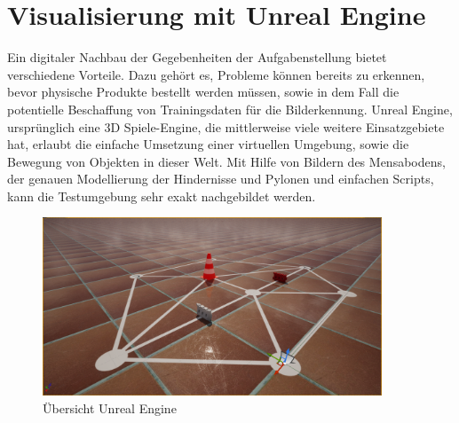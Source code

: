 \newpage
\section{Visualisierung mit Unreal Engine}
Ein digitaler Nachbau der Gegebenheiten der Aufgabenstellung bietet verschiedene Vorteile. Dazu gehört es, Probleme können bereits zu erkennen, bevor physische Produkte bestellt werden müssen, sowie in dem Fall die potentielle Beschaffung von Trainingsdaten für die Bilderkennung. Unreal Engine, ursprünglich eine 3D Spiele-Engine, die mittlerweise viele weitere Einsatzgebiete hat, erlaubt die einfache Umsetzung einer virtuellen Umgebung, sowie die Bewegung von Objekten in dieser Welt. Mit Hilfe von Bildern des Mensabodens, der genauen Modellierung der Hindernisse und Pylonen und einfachen Scripts, kann die Testumgebung sehr exakt nachgebildet werden.

\begin{figure}[h!]
            \centering
            \includegraphics[width=0.9\textwidth]{img/unrealengine/overview.png}
            \caption{Übersicht Unreal Engine}
        \label{img:Übersicht Unreal Engine}
        \end{figure}
